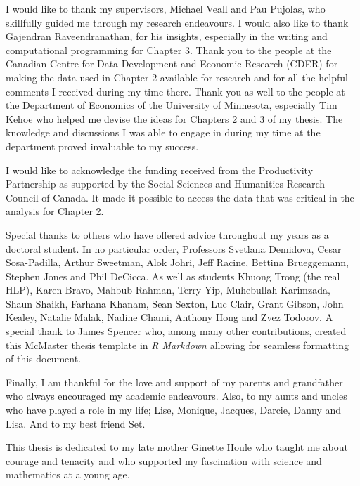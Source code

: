 \documentclass[12pt,twoside]{Mactemplate}
\begin{document}
  \begin{acknowledgements}
    I would like to thank my supervisors, Michael Veall and Pau Pujolas, who
    skillfully guided me through my research endeavours. I would also like
    to thank Gajendran Raveendranathan, for his insights, especially in the
    writing and computational programming for Chapter 3. Thank you to the
    people at the Canadian Centre for Data Development and Economic Research
    (CDER) for making the data used in Chapter 2 available for research and
    for all the helpful comments I received during my time there. Thank you
    as well to the people at the Department of Economics of the University
    of Minnesota, especially Tim Kehoe who helped me devise the ideas for
    Chapters 2 and 3 of my thesis. The knowledge and discussions I was able
    to engage in during my time at the department proved invaluable to my
    success.
    
    I would like to acknowledge the funding received from the Productivity
    Partnership as supported by the Social Sciences and Humanities Research
    Council of Canada. It made it possible to access the data that was
    critical in the analysis for Chapter 2.
    
    Special thanks to others who have offered advice throughout my years as
    a doctoral student. In no particular order, Professors Svetlana
    Demidova, Cesar Sosa-Padilla, Arthur Sweetman, Alok Johri, Jeff Racine,
    Bettina Brueggemann, Stephen Jones and Phil DeCicca. As well as students
    Khuong Trong (the real HLP), Karen Bravo, Mahbub Rahman, Terry Yip,
    Muhebullah Karimzada, Shaun Shaikh, Farhana Khanam, Sean Sexton, Luc
    Clair, Grant Gibson, John Kealey, Natalie Malak, Nadine Chami, Anthony
    Hong and Zvez Todorov. A special thank to James Spencer who, among many
    other contributions, created this McMaster thesis template in \emph{R
    Markdown} allowing for seamless formatting of this document.
    
    Finally, I am thankful for the love and support of my parents and
    grandfather who always encouraged my academic endeavours. Also, to my
    aunts and uncles who have played a role in my life; Lise, Monique,
    Jacques, Darcie, Danny and Lisa. And to my best friend Set.
    
    This thesis is dedicated to my late mother Ginette Houle who taught me
    about courage and tenacity and who supported my fascination with science
    and mathematics at a young age.
    \thispagestyle{plain}
  \end{acknowledgements}
  \hypersetup{linkcolor=black}
  \setcounter{tocdepth}{2}
  \tableofcontents
  \thispagestyle{plain}
\end{document}
